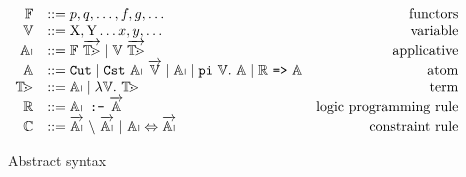 \documentclass{these-ISSS}
\begin{document}
\begin{figure}
  $$
  \begin{array}{rlr}
    \PRED & ::= p, q, \ldots, f, g, \ldots & \mathrm{functors}\\
    \VAR & ::= \mathrm{X}, \mathrm{Y} \ldots x, y, \ldots & \mathrm{variable}\\
    \APP & ::= \PRED\ \vecL{\TERM} \mid  \VAR\ \vecL{\TERM} & \mathrm{applicative}\\
    \ATOM& ::= \cut \mid \cst\ \APP\ \vecL{\VAR} \mid \APP \mid \piCmd{\VAR}{\ATOM} \mid \implCmd{{\CLAUSE}}{\ATOM} & \mathrm{atom} \\
    \TERM & ::= \APP \mid \lambda \VAR \bs\ \TERM & \mathrm{term}\\
    \CLAUSE & ::= \clauseCmd{\APP}{\!}{\vecL{\ATOM}} & \mathrm{logic\ programming\ rule}\\
    \CHR & ::= \vecL{\APP}\ \backslash\ \vecL{\APP}\ 
               \mathrm{|}\ \APP \Leftrightarrow  \vecL{\APP} & \mathrm{constraint\ rule}
  \end{array}
  $$
  \caption{Abstract syntax}
  \label{fig:syntax}
\end{figure}

\newenvironment{myRule}[1]{%
  \begin{minipage}{.9\textwidth}
    \centering
    \begin{prooftree}%
      } %
      {
    \end{prooftree}
    \vspace{2pt}
  \end{minipage}
}
\newcommand{\arr}{\ensuremath{\rightsquigarrow}}
\makeatletter
\newcommand{\customlabel}[2]{%
  \protected@write \@auxout {}{\string \newlabel {#1}{{\ensuremath{#2}}{\thepage}{#2}{#1}{}} }%
  \hypertarget{#1}{\ensuremath{#2}}
}
\makeatother
\newcommand{\runCmdR}[3]{\ensuremath{\run\ (k,\ #3,\ #1)\ #2 \arr r}}
\newcommand{\runCmdRK}[4]{\ensuremath{\run\ (#4,\ #3,\ #1)\ #2 \arr r}}
\newcommand{\runCmd}[7]{\ensuremath{\run\ (#4,\ #3,\ #1)\ #2 \arr (#7,\ #6,\ #5)}}
\newcommand{\runCmdQR}[2]{\ensuremath{\run\ #1\ #2 \arr r}}
\newcommand{\runQuery}[2]{\ensuremath{\run\ (\EmptySubst,\ \EmptySubst,\ #1)\ #2 \arr \_}}
\newcommand{\runCmdF}[3]{\ensuremath{\run\ (k,\ #3,\ #1)\ #2 \arr \bot}}
\newcommand{\callCmd}[2]{\ensuremath{(#1\ #2)}\xspace}
\newcommand{\goalCmd}[3]{\ensuremath{(#1,\ #2,\ #3)}\xspace}
\newcommand{\ruleName}[2]{\customlabel{#1}{\ensuremath{\mathrm{run}_{#2}}}}
\newcommand{\RightLabelM}[1]{\RightLabel{\scriptsize #1}}
\end{document}

